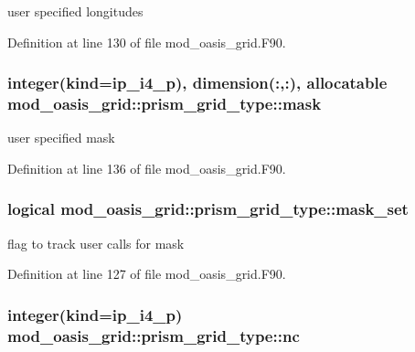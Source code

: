 user specified longitudes 



Definition at line 130 of file mod\+\_\+oasis\+\_\+grid.\+F90.

\hypertarget{structmod__oasis__grid_1_1prism__grid__type_ae50e83035d6214d862be48a5060887ae}{
\subsubsection[{mask}]{\setlength{\rightskip}{0pt plus 5cm}integer(kind=ip\+\_\+i4\+\_\+p), dimension(\+:,\+:), allocatable mod\+\_\+oasis\+\_\+grid\+::prism\+\_\+grid\+\_\+type\+::mask\hspace{0.3cm}{\ttfamily [private]}}}\label{structmod__oasis__grid_1_1prism__grid__type_ae50e83035d6214d862be48a5060887ae}


user specified mask 



Definition at line 136 of file mod\+\_\+oasis\+\_\+grid.\+F90.

\hypertarget{structmod__oasis__grid_1_1prism__grid__type_ae44525ecb0b2dfe8d4a4a8cf4abd4e1f}{
\subsubsection[{mask\+\_\+set}]{\setlength{\rightskip}{0pt plus 5cm}logical mod\+\_\+oasis\+\_\+grid\+::prism\+\_\+grid\+\_\+type\+::mask\+\_\+set\hspace{0.3cm}{\ttfamily [private]}}}\label{structmod__oasis__grid_1_1prism__grid__type_ae44525ecb0b2dfe8d4a4a8cf4abd4e1f}


flag to track user calls for mask 



Definition at line 127 of file mod\+\_\+oasis\+\_\+grid.\+F90.

\hypertarget{structmod__oasis__grid_1_1prism__grid__type_a9a562f1211ac03c0b308f156a9c88e39}{
\subsubsection[{nc}]{\setlength{\rightskip}{0pt plus 5cm}integer(kind=ip\+\_\+i4\+\_\+p) mod\+\_\+oasis\+\_\+grid\+::prism\+\_\+grid\+\_\+type\+::nc\hspace{0.3cm}{\ttfamily [private]}}}\label{structmod__oasis__grid_1_1prism__grid__type_a9a562f1211ac03c0b308f156a9c88e39}


